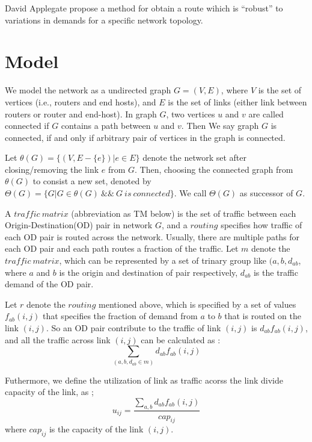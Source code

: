 \documentclass[conference]{IEEEtran}
\begin{document}
David Applegate propose a method for obtain a route wihich is ``robust'' to variations in demands for a specific network topology. 


\section{Model}
We model the network as a undirected graph $G = (V, E)$, where $V$ is the set of vertices (i.e., routers and end hosts), 
and $E$ is the set of links (either link between routers or router and end-host). In graph $G$, two vertices $u$ and $v$
are called connected if $G$ contains a path between $u$ and $v$. Then We say graph $G$ is connected, if and only if 
arbitrary pair of vertices in the graph is connected.

Let $\theta(G) = \{ (V, E - \{ e \}) | e \in E \}$ denote the network set after closing/removing the link $e$ from
$G$. Then, choosing the connected graph from $\theta(G)$ to consist a new set, denoted by 
$\Theta(G) = \{G | G \in \theta(G) \ \& \& \ G\ is\ connected\}$. We call $\Theta(G)$ as successor of $G$.

A $traffic\ matrix$ (abbreviation as TM below) is the set of traffic between each Origin-Destination(OD) pair in 
network $G$, and a $routing$ specifies how traffic of each OD pair is routed across the network. Usually, there are 
multiple paths for each OD pair and each path routes a fraction of the traffic. Let $m$ denote the $traffic\ matrix$, 
which can be represented by a set of trinary group like $(a, b, d_{ab}$, where $a$ and $b$ is the origin and 
destination of pair respectively, $d_{ab}$ is the traffic demand of the OD pair. 

Let $r$ denote the $routing$ mentioned above, which is specified by a set of values $f_{ab}(i,j)$ that specifies the 
fraction of demand from $a$ to $b$ that is routed on the link $(i,j)$. So an OD pair contribute to the traffic of 
link $(i,j)$ is $d_{ab}f_{ab}(i,j)$, and all the traffic across link $(i,j)$ can be calculated as :
\begin{equation}
	\sum_{(a,b,d_{ab}\in m)} d_{ab}f_{ab}(i,j)
\end{equation}

Futhermore, we define the utilization of link as traffic acorss the link divide capacity of the link, as ;
\begin{equation}
	u_{ij} = \frac{\sum_{a,b} d_{ab}f_{ab}(i,j)}{cap_{ij}}
\end{equation}
where $cap_{ij}$ is the capacity of the link $(i,j)$.
\end{document}
